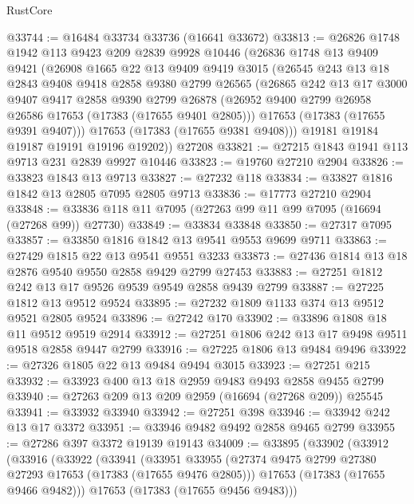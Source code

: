 \begin{lexlean}{RustCore}
\begin{coremodule}
@33744 := @16484 @33734 @33736 (@16641 @33672)
@33813 := @26826
    @1748
    @1942
    @113
    @9423
    @209
    @2839
    @9928
    @10446
    (@26836
      @1748
      @13
      @9409
      @9421
      (@26908
        @1665
        @22
        @13
        @9409
        @9419
        @3015
        (@26545
          @243
          @13
          @18
          @2843
          @9408
          @9418
          @2858
          @9380
          @2799
          @26565
          (@26865
            @242
            @13
            @17
            @3000
            @9407
            @9417
            @2858
            @9390
            @2799
            @26878
            (@26952 @9400 @2799 @26958 @26586 @17653 (@17383 (@17655 @9401 @2805)))
            @17653
            (@17383 (@17655 @9391 @9407)))
          @17653
          (@17383 (@17655 @9381 @9408)))
        @19181
        @19184
        @19187
        @19191
        @19196
        @19202))
    @27208
@33821 := @27215 @1843 @1941 @113 @9713 @231 @2839 @9927 @10446
@33823 := @19760 @27210 @2904
@33826 := @33823 @1843 @13 @9713
@33827 := @27232 @118
@33834 := @33827 @1816 @1842 @13 @2805 @7095 @2805 @9713
@33836 := @17773 @27210 @2904
@33848 := @33836 @118 @11 @7095 (@27263 @99 @11 @99 @7095 (@16694 (@27268 @99)) @27730)
@33849 := @33834 @33848
@33850 := @27317 @7095
@33857 := @33850 @1816 @1842 @13 @9541 @9553 @9699 @9711
@33863 := @27429 @1815 @22 @13 @9541 @9551 @3233
@33873 := @27436 @1814 @13 @18 @2876 @9540 @9550 @2858 @9429 @2799 @27453
@33883 := @27251 @1812 @242 @13 @17 @9526 @9539 @9549 @2858 @9439 @2799
@33887 := @27225 @1812 @13 @9512 @9524
@33895 := @27232 @1809 @1133 @374 @13 @9512 @9521 @2805 @9524
@33896 := @27242 @170
@33902 := @33896 @1808 @18 @11 @9512 @9519 @2914
@33912 := @27251 @1806 @242 @13 @17 @9498 @9511 @9518 @2858 @9447 @2799
@33916 := @27225 @1806 @13 @9484 @9496
@33922 := @27326 @1805 @22 @13 @9484 @9494 @3015
@33923 := @27251 @215
@33932 := @33923 @400 @13 @18 @2959 @9483 @9493 @2858 @9455 @2799
@33940 := @27263 @209 @13 @209 @2959 (@16694 (@27268 @209)) @25545
@33941 := @33932 @33940
@33942 := @27251 @398
@33946 := @33942 @242 @13 @17 @3372
@33951 := @33946 @9482 @9492 @2858 @9465 @2799
@33955 := @27286 @397 @3372 @19139 @19143
@34009 := @33895
    (@33902
      (@33912
        (@33916
          (@33922
            (@33941
              (@33951
                @33955
                (@27374 @9475 @2799 @27380 @27293 @17653 (@17383 (@17655 @9476 @2805)))
                @17653
                (@17383 (@17655 @9466 @9482)))
              @17653
              (@17383 (@17655 @9456 @9483)))

\end{coremodule}
\end{lexlean}
